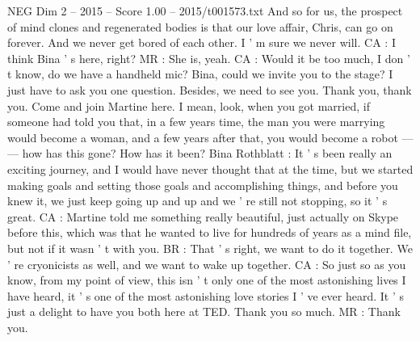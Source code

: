 \begin{textsample}{NEG Dim 2 – 2015 – Score 1.00 – 2015/t001573.txt}
And so for us, the prospect of mind clones and regenerated bodies is that our love affair, Chris, can go on forever.
And we never get bored of each other.
I ' m sure we never will.
CA : I think Bina ' s here, right?
MR : She is, yeah.
CA : Would it be too much, I don ' t know, do we have a handheld mic?
Bina, could we invite you to the stage?
I just have to ask you one question.
Besides, we need to see you.
Thank you, thank you.
Come and join Martine here.
I mean, look, when you got married, if someone had told you that, in a few years time, the man you were marrying would become a woman, and a few years after that, you would become a robot — — how has this gone?
How has it been?
Bina Rothblatt : It ' s been really an exciting journey, and I would have never thought that at the time, but we started making goals and setting those goals and accomplishing things, and before you knew it, we just keep going up and up and we ' re still not stopping, so it ' s great.
CA : Martine told me something really beautiful, just actually on Skype before this, which was that he wanted to live for hundreds of years as a mind file, but not if it wasn ' t with you.
BR : That ' s right, we want to do it together.
We ' re cryonicists as well, and we want to wake up together.
CA : So just so as you know, from my point of view, this isn ' t only one of the most astonishing lives I have heard, it ' s one of the most astonishing love stories I ' ve ever heard.
It ' s just a delight to have you both here at TED.
Thank you so much.
MR : Thank you.

\end{textsample}
